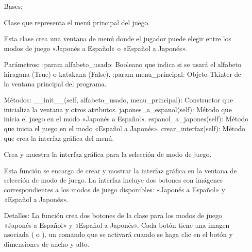 \documentclass[letterpaper,10pt,spanish]{sphinxmanual}
\begin{document}

\begin{fulllineitems}
\label{\detokenize{menu_juego:menu_juego.MenuJuego}}
\pysigstartsignatures
{}
\pysigstopsignatures
\sphinxAtStartPar
Bases: 

\sphinxAtStartPar
Clase que representa el menú principal del juego.

\sphinxAtStartPar
Esta clase crea una ventana de menú donde el jugador puede elegir entre los modos
de juego «Japonés a Español» o «Español a Japonés».

\sphinxAtStartPar
Parámetros:
:param alfabeto\_usado: Booleano que indica si se usará el alfabeto hiragana (True) o katakana (False).
:param menu\_principal: Objeto Tkinter de la ventana principal del programa.

\sphinxAtStartPar
Métodos:
\sphinxhyphen{} \_\_init\_\_(self, alfabeto\_usado, menu\_principal): Constructor que inicializa la ventana y otros atributos.
\sphinxhyphen{} japones\_a\_espanol(self): Método que inicia el juego en el modo «Japonés a Español».
\sphinxhyphen{} espanol\_a\_japones(self): Método que inicia el juego en el modo «Español a Japonés».
\sphinxhyphen{} crear\_interfaz(self): Método que crea la interfaz gráfica del menú.

\begin{fulllineitems}
\label{\detokenize{menu_juego:menu_juego.MenuJuego.crear_interfaz}}
\pysigstartsignatures
{}
\pysigstopsignatures
\sphinxAtStartPar
Crea y muestra la interfaz gráfica para la selección de modo de juego.

\sphinxAtStartPar
Esta función se encarga de crear y mostrar la interfaz gráfica en la ventana de selección de modo de juego.
La interfaz incluye dos botones con imágenes correspondientes a los modos de juego disponibles: «Japonés a
Español» y «Español a Japonés».

\sphinxAtStartPar
Detalles:
La función crea dos botones de la clase  para los modos de juego «Japonés a Español» y
«Español a Japonés». Cada botón tiene una imagen asociada ( o
), un comando que se activará cuando se haga clic en el botón y dimensiones de
ancho y alto.


\end{fulllineitems}
\end{fulllineitems}
\end{document}
